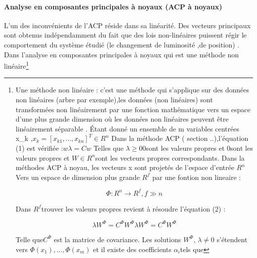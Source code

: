\paragraph{Analyse en composantes principales à noyaux (ACP à noyaux)}
L'un des inconvénients de l'ACP réside dans sa linéarité. Des vecteurs principaux sont obtenus indépendamment du fait que des lois non-linéaires puissent régir le comportement du système étudié (le changement de luminosité ,de position) \citep{honeine2007methodes}. Dans l'analyse en composantes principales à noyaux qui est une méthode non linéaire\footnote{Une méthode non linéaire : c'est une méthode qui s'applique sur des données non linéaires (arbre par exemple),les données (non linéaires) sont transformées non linéairement par une fonction mathématique vers un espace d’une plus grande dimension où les données non linéaires peuvent être linéairement séparable \citep{diederich2001face}.
	Étant donné un ensemble de m variables centrées  x_{k} ,$x_{k}=[x_{k1},...,x_{kn}]^{T}\in R^{n}$
	Dans la méthode ACP ( section ..),l’équation (1) est vérifiée :$w\lambda =Cw$
	Telles que $\lambda \geq 0$0sont les valeurs propres et 0sont les valeurs propres et $W\in R^{n}$sont les vecteurs propres correspondants.
	Dans la méthodes ACP à noyau, les vecteurs x sont projetés de l’espace d’entrée $R^{n}$ Vers un espace de dimension plus grande $R^{f}$ par une fontion non lineaire :
	\begin{center}
	\begin{equation}\label{eq:chapitre3eq3}
	\Phi :R^{n}\rightarrow R^{f}, f\gg n	
	\end{equation}
\end{center}
Dans $R^{f}$trouver les valeurs propres revient à résoudre l’équation (2) :
\begin{center}
	\begin{equation}\label{eq:chapitre3eq4}
	\lambda W^{\Phi }=C^{\Phi }W^{\Phi } λW^Φ=C^Φ W^Φ
	\end{equation}
\end{center}
Telle que$C^{\Phi }$ est la matrice de covariance. Les solutions $W^{\Phi }$, $\lambda \neq 0$ s’étendent vers $\Phi \left ( x_{1} \right ) ,...,\Phi \left ( x_{m} \right )$ et il existe des coefficients $\alpha _{i}$tels que 

}
